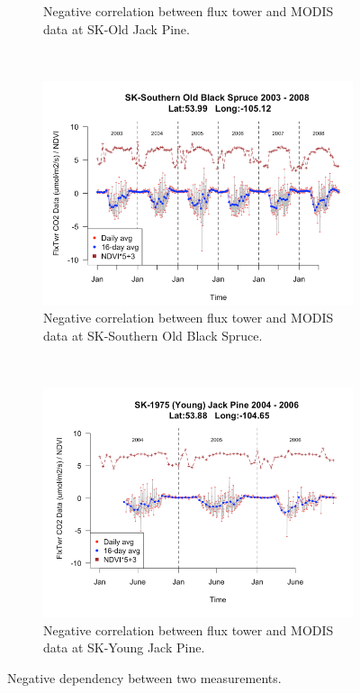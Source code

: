 \documentclass{article}
\begin{document}
\begin{figure}[ht]
\begin{subfigure}[ht]{0.45\textwidth}
        \caption{Negative correlation between flux tower and MODIS data at SK-Old Jack Pine.}
        \label{Fig:NegCorr_OJP}
     \end{subfigure}
        ~ %
      \begin{subfigure}[ht]{0.45\textwidth}
        \includegraphics[width=\textwidth]{SOU_plot_together.png}
        \caption{Negative correlation between flux tower and MODIS data at SK-Southern Old Black Spruce.}
        \label{Fig:NegCorr_SOU}
     \end{subfigure}
     ~
      \begin{subfigure}[ht]{0.45\textwidth}
        \includegraphics[width=\textwidth]{YJP_plot_together.png}
        \caption{Negative correlation between flux tower and MODIS data at SK-Young Jack Pine.}
        \label{Fig:NegCorr_YJP}
     \end{subfigure}
    \caption{Negative dependency between two measurements.}\label{Fig:NegCorr}
\end{figure}
\end{document}
